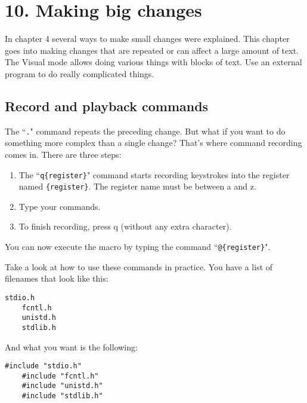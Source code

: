 \section{10. Making big changes}
In chapter 4 several ways to make small changes were explained.  This chapter
goes into making changes that are repeated or can affect a large amount of
text.  The Visual mode allows doing various things with blocks of text.  Use
an external program to do really complicated things.
\localtableofcontents
\subsection{Record and playback commands}
The ``\texttt{.}" command repeats the preceding change.
But what if you want to do something more complex than a single change?  That's where command recording comes in.
There are three steps:

\begin{enumerate}
				\item The ``\texttt{q\{register\}}" command starts recording keystrokes into the register named \texttt{\{register\}}.
								The register name must be between a and z.
				\item Type your commands.
				\item To finish recording, press q (without any extra character).
\end{enumerate}

You can now execute the macro by typing the command ``\texttt{@\{register\}}".

Take a look at how to use these commands in practice.
You have a list of filenames that look like this:

\begin{Verbatim}[samepage=true]
    stdio.h
    fcntl.h
    unistd.h
    stdlib.h
\end{Verbatim}

And what you want is the following:

\begin{Verbatim}[samepage=true]
    #include "stdio.h"
    #include "fcntl.h"
    #include "unistd.h"
    #include "stdlib.h"
\end{Verbatim}

